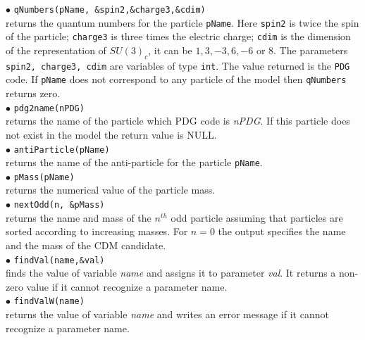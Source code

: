 \documentclass[12pt,a4paper]{article}
\begin{document}
% 
%
\noindent 
$\bullet$ \verb|qNumbers(pName, &spin2,&charge3,&cdim)|\\
returns the quantum numbers for the particle \verb|pName|. Here \verb|spin2| is twice the spin of the particle; \verb|charge3| is 
three times the electric charge; \verb|cdim| is the  dimension of the representation
of $SU(3)_c$, it can be $1,3,-3,6,-6$ or $8$. The parameters {\tt spin2, charge3, cdim} are 
variables of type {\tt int}. The value returned 
is the {\tt PDG} code. If \verb|pName| does not correspond to any
particle of the model then \verb|qNumbers| returns zero.\\[2mm]
%
$\bullet$  \verb|pdg2name(nPDG)| \\
returns  the name of  the particle which PDG code is {\it nPDG}. If this particle does not exist in the model
the return value is NULL.\\[2mm]
%
$\bullet$  \verb|antiParticle(pName)| \\
returns  the name of the anti-particle for the particle \verb|pName|.\\[2mm]
%
$\bullet$  \verb|pMass(pName)| \\
returns  the numerical value of the particle mass.\\[2mm]
%
$\bullet$  \verb|nextOdd(n, &pMass)| \\
returns the name and mass of the $n^{th}$ odd particle assuming that particles are 
sorted according to increasing masses. For $n=0$ the output specifies the 
name and the mass of the CDM candidate. \\[2mm]
%
$\bullet$ \verb|findVal(name,&val)|\\
 finds the  value of
 variable  {\it name} and assigns it to parameter {\it val}. It returns a non-zero
value  if it cannot recognize  a parameter name.\\[2mm]
%
$\bullet$ \verb|findValW(name)| \\
returns the value of variable {\it name} and writes an error message
if it cannot recognize  a parameter name.\\[2mm]
\end{document}
